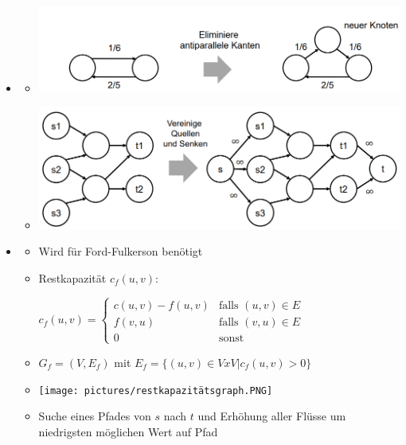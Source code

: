 \documentclass[
    ngerman,
    color=3b,
    dark_mode,
    load_common, %
    summary,
    boxarc,
]{tuda_summary}
\begin{document}
\begin{itemize}
    \item {}
          \begin{itemize}
              \item[] \includegraphics[width=12cm]{pictures/flussTrans1.PNG}
              \item[] \includegraphics[width=12cm]{pictures/flussTrans2.PNG}
          \end{itemize}
          \clearpage
    \item {}
          \begin{itemize}
              \item Wird für Ford-Fulkerson benötigt
              \item Restkapazität $c_f(u,v)$: \\
                    \centerline{$c_f(u,v) = \begin{cases}
                                c(u,v) - f(u,v) & \text{falls $(u,v) \in E$} \\
                                f(v,u)          & \text{falls $(v,u) \in E$} \\
                                0               & \text{sonst}
                            \end{cases}$}
              \item $G_f = (V, E_f)$ mit $E_f = \{(u,v) \in V x V | c_f(u,v) > 0 \}$
              \item[] \texttt{[image: pictures/restkapazitätsgraph.PNG]}
              \item Suche eines Pfades von $s$ nach $t$ und Erhöhung aller Flüsse um niedrigsten möglichen Wert auf Pfad
          \end{itemize}



\end{itemize}
\end{document}

